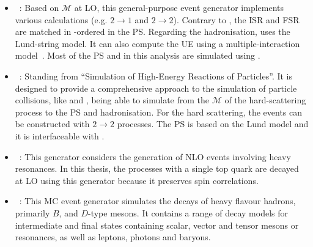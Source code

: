 \begin{itemize}
	\item \textbf{\Pythia[8]}~\cite{Sjostrand:2007gs, Sjostrand:2014zea}: 
		Based on $\mathcal{M}$ at LO, this general-purpose
		event generator implements
		various calculations (e.g. $2 \rightarrow 1$ and $2 \rightarrow 2$).
		Contrary to \Herwig, the ISR and FSR are matched in \pT-ordered in the PS. 
		Regarding the hadronisation, \Pythia[8] uses the Lund-string model.
		It can also compute the UE using a multiple-interaction model~\cite{Sjostrand:1987su}.
		Most of the PS 
		and \pileup in this analysis are
		simulated using \Pythia[8]. %
		
	\item \textbf{\Sherpa}~\cite{Gleisberg:2008ta, Sherpa:2019gpd}: 
		Standing from ``Simulation of High-Energy Reactions of Particles''.
		It is designed to provide a comprehensive approach to the simulation of particle collisions, 
		like \Herwig and \Pythia, %
		being able to simulate from the $\mathcal{M}$ of the hard-scattering process to the PS and hadronisation.
		For the hard scattering, the events can be constructed with $2 \rightarrow 2$  processes. 
		The PS is based on the Lund model and it is interfaceable with \Pythia[8].
		
	\item \textbf{\MADSPIN}~\cite{Frixione:2007zp, Artoisenet:2012st}:
		This generator considers the generation of NLO events involving heavy resonances.
		In this thesis, the processes with a single top quark are decayed at LO using this generator because
		it preserves spin correlations.
	\item \textbf{\EVTGEN}~\cite{Lange:2001uf}: This MC event generator simulates the decays of 
		heavy flavour hadrons, primarily $B$, and $D$-type mesons. It contains a range of decay 
		models for intermediate and final states containing scalar, vector and tensor mesons or 
		resonances, as well as leptons, photons and baryons.
\end{itemize}


